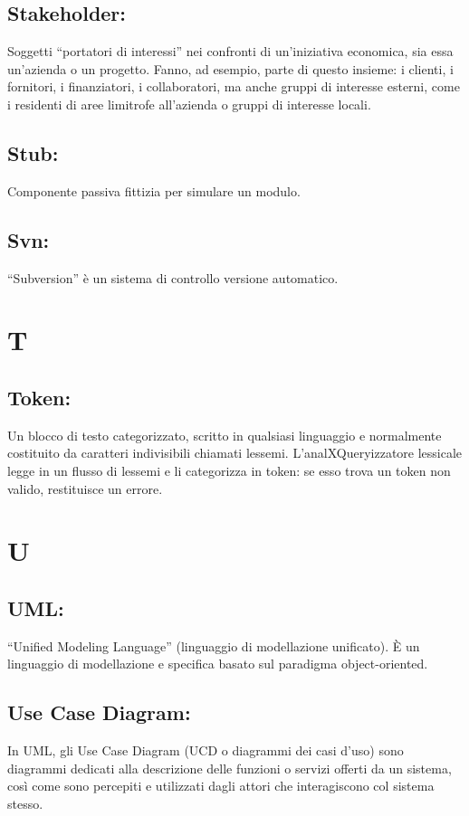 \section{Stakeholder:}
Soggetti ``portatori di interessi'' nei confronti di un'iniziativa economica, sia essa un'azienda o un progetto. Fanno, ad esempio, parte di questo insieme: i clienti, i fornitori, i finanziatori, i collaboratori, ma anche gruppi di interesse esterni, come i residenti di aree limitrofe all'azienda o gruppi di interesse locali.
\section{Stub:}
Componente passiva fittizia per simulare un modulo.
\section{Svn:}
``Subversion'' \`e un sistema di controllo versione automatico. 

\chapter{T}
\section{Token:}
Un blocco di testo categorizzato, scritto in qualsiasi linguaggio e normalmente costituito da caratteri indivisibili chiamati lessemi. L'analXQueryizzatore lessicale legge in un flusso di lessemi e li categorizza in token: se esso trova un token non valido, restituisce un errore.

\chapter{U}
\section{UML:}
``Unified Modeling Language'' (linguaggio di modellazione unificato). \`E un linguaggio di modellazione e specifica basato sul paradigma object-oriented.
\section{Use Case Diagram:}
In UML, gli Use Case Diagram (UCD o diagrammi dei casi d'uso) sono diagrammi dedicati alla descrizione delle funzioni o servizi offerti da un sistema, cos\`i come sono percepiti e utilizzati dagli attori che interagiscono col sistema stesso. 

